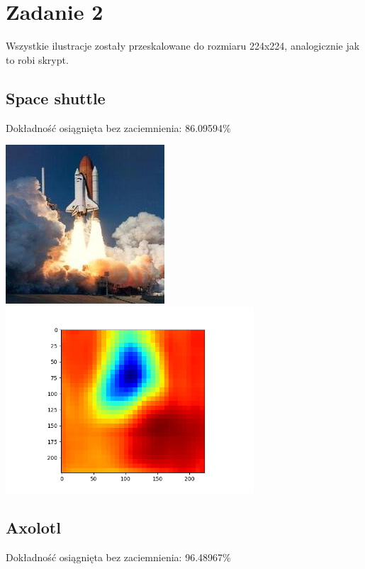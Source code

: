 \section{Zadanie 2}\label{zadanie-2}

Wszystkie ilustracje zostały przeskalowane do rozmiaru 224x224,
analogicznie jak to robi skrypt.

\subsection{Space shuttle}\label{space-shuttle}

Dokładność osiągnięta bez zaciemnienia: 86.09594\%

\includegraphics[width=2.33333in]{./hw2/shuttle.sq.jpg}
\includegraphics[width=3.64583in]{./hw2/shuttle.jpg.heatmap.png}

\subsection{Axolotl}\label{axolotl}

Dokładność osiągnięta bez zaciemnienia: 96.48967\%

